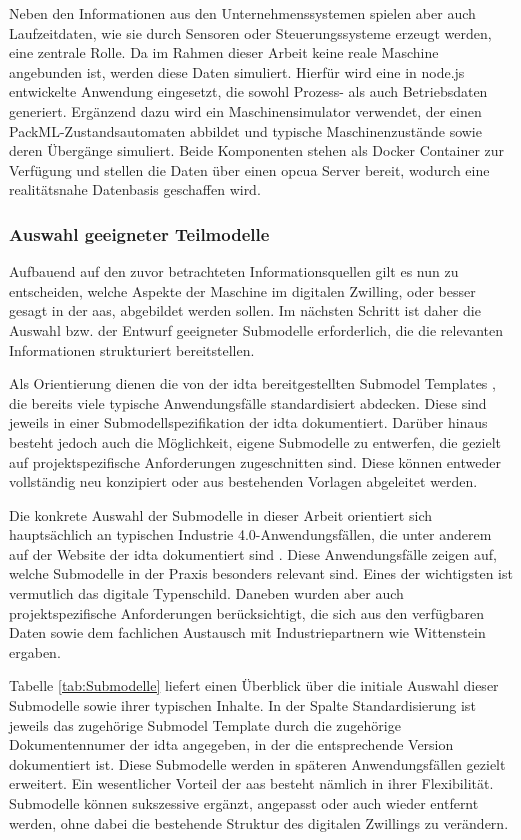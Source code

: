 Neben den Informationen aus den Unternehmenssystemen spielen aber auch Laufzeitdaten, wie sie durch Sensoren oder Steuerungssysteme erzeugt werden, eine zentrale Rolle.
Da im Rahmen dieser Arbeit keine reale Maschine angebunden ist, werden diese Daten simuliert.
Hierfür wird eine in node.js entwickelte Anwendung eingesetzt, die sowohl Prozess- als auch Betriebsdaten generiert. 
Ergänzend dazu wird ein Maschinensimulator verwendet, der einen PackML-Zustandsautomaten abbildet und typische Maschinenzustände sowie deren Übergänge simuliert. 
Beide Komponenten stehen als Docker Container zur Verfügung und stellen die Daten über einen \acs{opcua} Server bereit, wodurch eine realitätsnahe Datenbasis geschaffen wird.
\subsubsection{Auswahl geeigneter Teilmodelle}
Aufbauend auf den zuvor betrachteten Informationsquellen gilt es nun zu entscheiden, welche Aspekte der Maschine im digitalen Zwilling, oder besser gesagt in der \acs{aas}, abgebildet werden sollen.
Im nächsten Schritt ist daher die Auswahl bzw. der Entwurf geeigneter Submodelle erforderlich, die die relevanten Informationen strukturiert bereitstellen.

Als Orientierung dienen die von der \acs{idta} bereitgestellten Submodel Templates \cite{idtaTemplates}, die bereits viele typische Anwendungsfälle standardisiert abdecken.
Diese sind jeweils in einer Submodellspezifikation der \acs{idta} dokumentiert.
Darüber hinaus besteht jedoch auch die Möglichkeit, eigene Submodelle zu entwerfen, die gezielt auf projektspezifische Anforderungen zugeschnitten sind.
Diese können entweder vollständig neu konzipiert oder aus bestehenden Vorlagen abgeleitet werden.

Die konkrete Auswahl der Submodelle in dieser Arbeit orientiert sich hauptsächlich an typischen Industrie 4.0-Anwendungsfällen, die unter anderem auf der Website der \acs{idta} dokumentiert sind \cite{idtaUseCases}.
Diese Anwendungsfälle zeigen auf, welche Submodelle in der Praxis besonders relevant sind.
Eines der wichtigsten ist vermutlich das digitale Typenschild.
Daneben wurden aber auch projektspezifische Anforderungen berücksichtigt, die sich aus den verfügbaren Daten sowie dem fachlichen Austausch mit Industriepartnern wie Wittenstein ergaben.

Tabelle \ref{tab:Submodelle} liefert einen Überblick über die initiale Auswahl dieser Submodelle sowie ihrer typischen Inhalte.
In der Spalte Standardisierung ist jeweils das zugehörige Submodel Template durch die zugehörige Dokumentennumer der \acs{idta} angegeben, in der die entsprechende Version dokumentiert ist.
Diese Submodelle werden in späteren Anwendungsfällen gezielt erweitert.
Ein wesentlicher Vorteil der \acs{aas} besteht nämlich in ihrer Flexibilität.
Submodelle können sukszessive ergänzt, angepasst oder auch wieder entfernt werden, ohne dabei die bestehende Struktur des digitalen Zwillings zu verändern.


